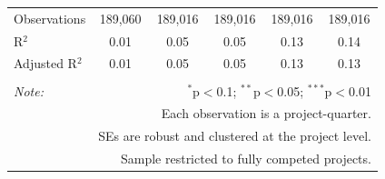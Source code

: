 \documentclass[
]{article}
\begin{document}
\begin{table}[H]
\begin{tabular}{@{\extracolsep{-2pt}}lccccc}
Observations & 189,060 & 189,016 & 189,016 & 189,016 & 189,016 \\ 
R$^{2}$ & 0.01 & 0.05 & 0.05 & 0.13 & 0.14 \\ 
Adjusted R$^{2}$ & 0.01 & 0.05 & 0.05 & 0.13 & 0.13 \\ 
\hline 
\hline \\[-1.8ex] 
\textit{Note:}  & \multicolumn{5}{r}{$^{*}$p$<$0.1; $^{**}$p$<$0.05; $^{***}$p$<$0.01} \\ 
 & \multicolumn{5}{r}{Each observation is a project-quarter.} \\ 
 & \multicolumn{5}{r}{SEs are robust and clustered at the project level.} \\ 
 & \multicolumn{5}{r}{Sample restricted to fully competed projects.} \\ 
\end{tabular} 
\end{table}
\end{document}
